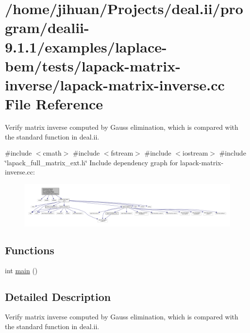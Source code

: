 \hypertarget{lapack-matrix-inverse_8cc}{}\section{/home/jihuan/\+Projects/deal.ii/program/dealii-\/9.1.1/examples/laplace-\/bem/tests/lapack-\/matrix-\/inverse/lapack-\/matrix-\/inverse.cc File Reference}
\label{lapack-matrix-inverse_8cc}


Verify matrix inverse computed by Gauss elimination, which is compared with the standard function in deal.\+ii.  


{\ttfamily \#include $<$cmath$>$}\newline
{\ttfamily \#include $<$fstream$>$}\newline
{\ttfamily \#include $<$iostream$>$}\newline
{\ttfamily \#include \char`\"{}lapack\+\_\+full\+\_\+matrix\+\_\+ext.\+h\char`\"{}}\newline
Include dependency graph for lapack-\/matrix-\/inverse.cc\+:
\nopagebreak
\begin{figure}[H]
\begin{center}
\leavevmode
\includegraphics[width=350pt]{lapack-matrix-inverse_8cc__incl}
\end{center}
\end{figure}
\subsection*{Functions}
\begin{DoxyCompactItemize}
\item 
int \hyperlink{lapack-matrix-inverse_8cc_ae66f6b31b5ad750f1fe042a706a4e3d4}{main} ()
\end{DoxyCompactItemize}


\subsection{Detailed Description}
Verify matrix inverse computed by Gauss elimination, which is compared with the standard function in deal.\+ii. 

